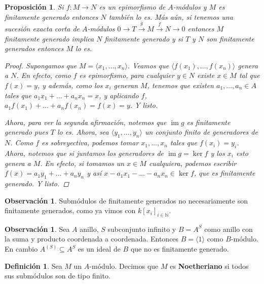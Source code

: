 \documentclass[12pt]{book}
\newtheorem{prop}[teo]{Proposición}
\theoremstyle{definition}
\newtheorem{obs}[teo]{Observación}
\newtheorem{defn}[teo]{Definición}
\newcommand{\NN}{\mathbb{N}}
\DeclareMathOperator{\im}{im}
\begin{document}
\begin{prop}
Si $f:M\to N$ es un epimorfismo de $A$-módulos y $M$ es finitamente generado entonces $N$ también lo es. Más aún, si tenemos una sucesión exacta corta de $A$-módulos $0\longrightarrow T\stackrel{g}{\longrightarrow} M\stackrel{f}{\longrightarrow} N\longrightarrow 0$ entonces $M$ finitamente generado implica $N$ finitamente generado y si $T$ y $N$ son finitamente generados entonces $M$ lo es.

\begin{proof}
Supongamos que $M=\langle x_1,\ldots , x_n\rangle$. Veamos que $\langle f(x_1),\ldots , f(x_n)\rangle$ genera a $N$. En efecto, como $f$ es epimorfismo, para cualquier $y\in N$ existe $x\in M$ tal que $f(x)=y$, y además, como los $x_i$ generan $M$, tenemos que existen $a_1,\ldots ,a_n\in A$ tales que $a_1x_1+\ldots +a_nx_n = x$, y aplicando $f$, $a_1f(x_1)+\ldots + a_nf(x_n) = f(x)=y$. Y listo.

Ahora, para ver la segunda afirmación, notemos que $\im g$ es finitamente generado pues $T$ lo es. Ahora, sea $\langle y_1,\ldots , y_n\rangle$ un conjunto finito de generadores de $N$. Como $f$ es sobreyectiva, podemos tomar $x_1,\ldots , x_n$ tales que $f(x_i)=y_i$. Ahora, notemos que si juntamos los generadores de $\im g = \ker f$ y los $x_i$ esto genera a $M$. En efecto, si tomamos un $x\in M$ cualquiera, podemos escribir $f(x) = a_1y_1 + \ldots + a_ny_n$ y así $x - a_1x_1 - \ldots - a_n x_n \in \ker f$, que es finitamente generado. Y listo.
 
\end{proof}
\end{prop}

\begin{obs}
Submódulos de finitamente generados no necesariamente son finitamente generados, como ya vimos con $k[x_i]_{i\in\NN}$.
\end{obs}

\begin{obs}
Sea $A$ anillo, $S$ subconjunto infinito y $B=A^S$ como anillo con la suma y producto coordenada a coordenada. Entonces $B=\langle 1\rangle$ como $B$-módulo. En cambio $A^{(S)}\subseteq A^S$ es un ideal de $B$ que no es finitamente generado.
\end{obs}

\begin{defn}
Sea $M$ un $A$-módulo. Decimos que $M$ es \textbf{Noetheriano} si todos sus submódulos son de tipo finito.
\end{defn}
\end{document}
